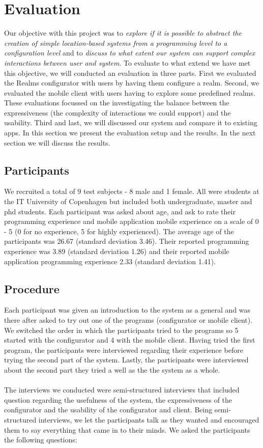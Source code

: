 \section{Evaluation}
\label{sec.eval}
Our objective with this project was to \emph{explore if it is possible to abstract the creation of simple location-based systems from a programming level to a configuration level} and to \emph{discuss to what extent our system can support complex interactions between user and system}. To evaluate to what extend we have met this objective, we will conducted an evaluation in three parts. First we evaluated the Realms configurator with users by having them configure a realm. Second, we evaluated the mobile client with users having to explore some predefined realms. These evaluations focussed on the investigating the balance between the expressiveness (the complexity of interactions we could support) and the usability.  Third and last, we will discussed our system and compare it to existing apps. In this section we present the evaluation setup and the results. In the next section we will discuss the results.

\subsection{Participants} %
\label{sub:participants}
We recruited a total of 9 test subjects - 8 male and 1 female. All were students at the IT University of Copenhagen but included both undergraduate, master and phd students. Each participant was asked about age, and ask to rate their programming experience and mobile application mobile experience on a scale of 0 - 5 (0 for no experience, 5 for highly experienced). The average age of the participants was 26.67 (standard deviation 3.46). Their reported programming experience was 3.89 (standard deviation 1.26) and their reported mobile application programming experience 2.33 (standard deviation 1.41). 

\subsection{Procedure} %
\label{sub:procedure}
Each participant was given an introduction to the system as a general and was there after asked to try out one of the programs (configurator or mobile client). We switched the order in which the participants tried to the programs so 5 started with the configurator and 4 with the mobile client. Having tried the first program, the participants were interviewed regarding their experience before trying the second part of the system. Lastly, the participants were interviewed about the second part they tried a well as the the system as a whole. 
\\\\
The interviews we conducted were semi-structured interviews that included question regarding the usefulness of the system, the expressiveness of the configurator and the usability of the configurator and client. Being semi-structured interviews, we let the participants talk as they wanted and encouraged them to say everything that came in to their minds. We asked the participants the following questions:

